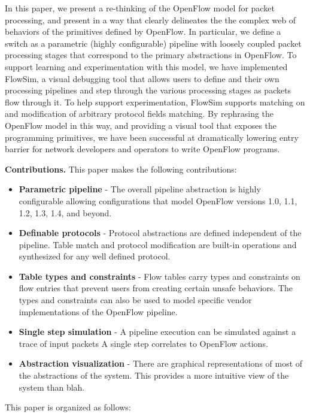 In this paper, we present a re-thinking of the OpenFlow model for
packet processing, and present in a way that clearly delineates the
the complex web of behaviors of the primitives defined by OpenFlow.
In particular, we define a switch as a parametric (highly configurable)
pipeline with loosely coupled packet processing stages that correspond
to the primary abstractions in OpenFlow.
To support learning and experimentation with this model, we have 
implemented FlowSim, a visual debugging tool that allows users to
define and their own processing pipelines and step through the
various processing stages as packets flow through it. To help support
experimentation, FlowSim supports matching on and modification of arbitrary 
protocol fields matching.
By rephrasing the OpenFlow model in this way, and providing a visual
tool that exposes the programming primitives, we have been successful
at dramatically lowering entry barrier for network developers and
operators to write OpenFlow programs.


\textbf{Contributions.} This paper makes the following contributions:
\begin{itemize}
  \item \textbf{Parametric pipeline} - The overall pipeline abstraction is
        highly configurable allowing configurations that model OpenFlow 
        versions 1.0, 1.1, 1.2, 1.3, 1.4, and beyond.
  \item \textbf{Definable protocols} - Protocol abstractions are defined 
        independent of the pipeline. Table match and protocol modification are
        built-in operations and synthesized for any well defined protocol.
  \item \textbf{Table types and constraints} - Flow tables carry types and
        constraints on flow entries that prevent users from creating certain
        unsafe behaviors. The types and constraints can also be used to model
        specific vendor implementations of the OpenFlow pipeline.
  \item \textbf{Single step simulation} - A pipeline execution can be simulated
        against a trace of input packets A single step correlates to OpenFlow
        actions.
  \item \textbf{Abstraction visualization} - There are graphical representations
        of most of the abstractions of the system. This provides a more intuitive
        view of the system than blah.
\end{itemize}

This paper is organized as follows:
